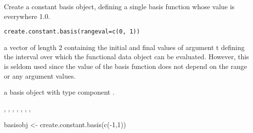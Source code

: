\documentclass{article}
\begin{document}
\begin{Description}\relax
Create a constant basis object, defining a single basis function
whose value is everywhere 1.0.
\end{Description}
\begin{Usage}
\begin{verbatim}
create.constant.basis(rangeval=c(0, 1))
\end{verbatim}
\end{Usage}
\begin{Arguments}
\begin{ldescription}
\item[\code{rangeval}] a vector of length 2 containing the initial and final
values of argument t defining the interval over which the functional
data object can be evaluated.  However, this is seldom used 
since the value of the basis function does not depend on the range
or any argument values.

\end{ldescription}
\end{Arguments}
\begin{Value}
a basis object with type component .
\end{Value}
\begin{SeeAlso}\relax
{}, 
, 
, 
, 
, 
, 
, 
\end{SeeAlso}
\begin{Examples}
\begin{ExampleCode}

basisobj <- create.constant.basis(c(-1,1))

\end{ExampleCode}
\end{Examples}
\end{document}

